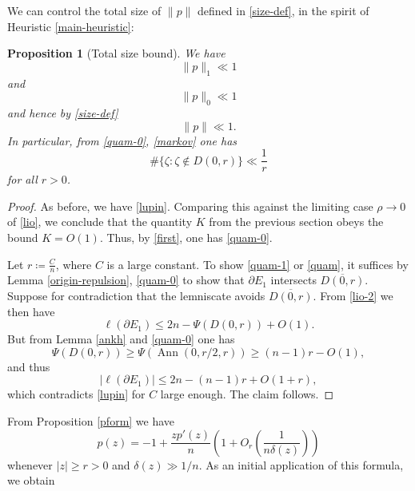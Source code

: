 \documentclass[12pt]{amsart}
\newtheorem{proposition}[theorem]{Proposition}
\newcommand{\Ann}{\operatorname{Ann}}
\begin{document}
We can control the total size of $\|p\|$ defined in \eqref{size-def}, in the spirit of Heuristic \ref{main-heuristic}:

\begin{proposition}[Total size bound]\label{lemni}  We have
\begin{equation}\label{quam-0}
    \|p\|_1 \ll 1
\end{equation}
and
\begin{equation}\label{quam-1}
    \|p\|_0 \ll 1
\end{equation}
and hence by \eqref{size-def}
\begin{equation}\label{quam}
 \|p\| \ll 1.
\end{equation}
In particular, from \eqref{quam-0}, \eqref{markov} one has
\begin{equation}\label{quam-markov}
    \# \{ \zeta: \zeta \notin D(0,r) \} \ll \frac{1}{r}
\end{equation}
for all $r>0$.
\end{proposition}

\begin{proof}
 As before, we have \eqref{lupin}.  Comparing this against the limiting case $\rho \to 0$ of \eqref{lio}, we conclude that the quantity $K$ from the previous section obeys the bound $K=O(1)$.  Thus, by \eqref{first}, one has \eqref{quam-0}.

Let $r \coloneqq \frac{C}{n}$, where $C$ is a large constant.  To show \eqref{quam-1} or \eqref{quam}, it suffices by Lemma \ref{origin-repulsion}, \eqref{quam-0} to show that $\partial E_1$ intersects $\overline{D(0,r)}$.  Suppose for contradiction that the lemniscate avoids $\overline{D(0,r)}$.  From \eqref{lio-2} we then have
$$  \ell(\partial E_1) \leq 2n - \Psi(D(0,r)) + O(1).$$
But from Lemma \ref{ankh} and \eqref{quam-0} one has
$$\Psi(D(0,r)) \geq \Psi(\Ann(0,r/2,r)) \geq (n-1) r - O(1),$$
and thus
$$ |\ell(\partial E_1)| \leq 2n - (n-1) r + O( 1 + r),$$
which contradicts \eqref{lupin} for $C$ large enough.  The claim follows.
\end{proof}

From Proposition \ref{pform} we have
\begin{equation}\label{pform-alt}
 p(z) = -1 + \frac{zp'(z)}{n} \left( 1 + O_r\left(\frac{1}{n \delta(z)} \right) \right)
\end{equation}
whenever $|z| \geq r > 0$ and $\delta(z) \gg 1/n$.
As an initial application of this formula, we obtain
\end{document}
